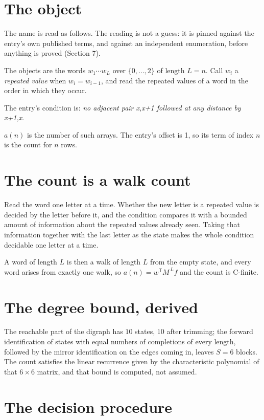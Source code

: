 \documentclass[11pt]{article}
\theoremstyle{definition}
\begin{document}
\section{The object}

The name is read as follows. The reading is not a guess: it is pinned against the entry's own published terms, and against an independent enumeration, before anything is proved (Section 7).

The objects are the words $w_1\cdots w_L$ over $\{0,\dots,2\}$ of length $L = n$. Call $w_i$ a {\itshape repeated value} when $w_i = w_{i-1}$, and read the repeated values of a word in the order in which they occur.

The entry's condition is: {\itshape no adjacent pair x,x+1 followed at any distance by x+1,x}.

$a(n)$ is the number of such arrays. The entry's offset is 1, so its term of index $n$ is the count for $n$ rows.

\section{The count is a walk count}

Read the word one letter at a time. Whether the new letter is a repeated value is decided by the letter before it, and the condition compares it with a bounded amount of information about the repeated values already seen. Taking that information together with the last letter as the state makes the whole condition decidable one letter at a time.

A word of length $L$ is then a walk of length $L$ from the empty state, and every word arises from exactly one walk, so $a(n) = w^{\mathsf T}M^{\,L}f$ and the count is C-finite.

\section{The degree bound, derived}

The reachable part of the digraph has $10$ states, $10$ after trimming; the forward identification of states with equal numbers of completions of every length, followed by the mirror identification on the edges coming in, leaves $S = 6$ blocks. The count satisfies the linear recurrence given by the characteristic polynomial of that $6\times6$ matrix, and that bound is computed, not assumed.

\section{The decision procedure}
\end{document}
